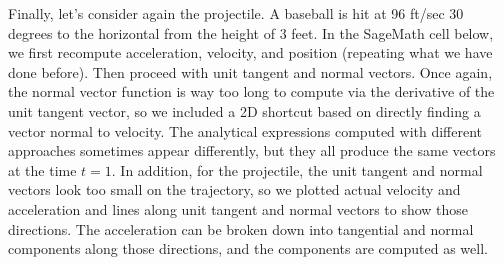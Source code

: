 Finally, let's consider again the projectile.   A baseball is hit at 96 ft/sec 30 degrees to the horizontal from the height of 3 feet.  In the SageMath cell below, we first recompute acceleration, velocity, and position (repeating what we have done before).  Then proceed with unit tangent and normal vectors.   Once again, the normal vector function is way too long to compute via the derivative of the unit tangent vector, so we included a 2D shortcut based on directly finding a vector normal to velocity.   The analytical expressions computed with different approaches sometimes appear differently, but they all produce the same vectors at the time $t=1$. In addition, for the projectile, the unit tangent and normal vectors look too small on the trajectory, so we plotted actual velocity and acceleration and lines along unit tangent and normal vectors to show those directions.  The acceleration can be broken down into tangential and normal components along those directions, and the components are computed as well.

